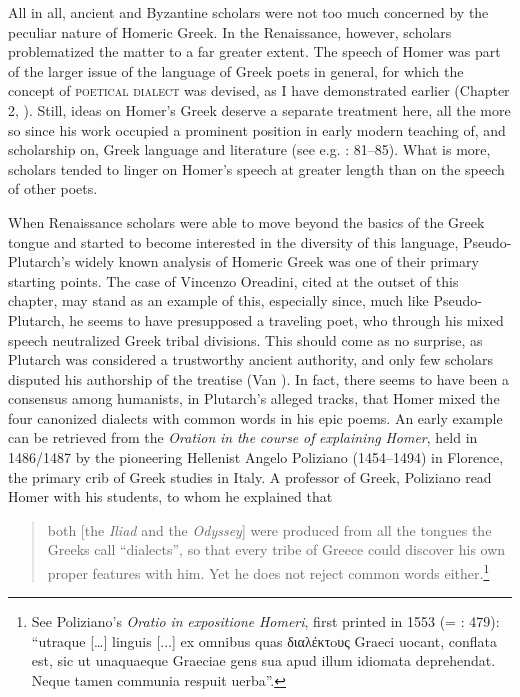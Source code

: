 All in all, ancient and Byzantine scholars were not too much concerned by the peculiar nature of Homeric Greek. In the Renaissance, however, scholars problematized the matter to a far greater extent. The speech of Homer was part of the larger issue of the language of Greek poets in general, for which the concept of \textsc{poetical} \textsc{dialect} was devised, as I have demonstrated earlier (Chapter 2, ). Still, ideas on Homer’s Greek deserve a separate treatment here, all the more so since his work occupied a prominent position in early modern teaching of, and scholarship on, Greek language and literature (see e.g. \citealt{Botley2010}: 81–85). What is more, scholars tended to linger on Homer’s speech at greater length than on the speech of other poets.

When Renaissance scholars were able to move beyond the basics of the Greek tongue and started to become interested in the diversity of this language, Pseudo-Plutarch’s widely known analysis of Homeric Greek was one of their primary starting points. The case of Vincenzo Oreadini, cited at the outset of this chapter, may stand as an example of this, especially since, much like Pseudo-Plutarch, he seems to have presupposed a traveling poet, who through his mixed speech neutralized Greek tribal divisions. This should come as no surprise, as Plutarch was considered a trustworthy ancient authority, and only few scholars disputed his authorship of the treatise (Van \citealt{Rooy2018c}). In fact, there seems to have been a consensus among humanists, in Plutarch’s alleged tracks, that Homer mixed the four canonized dialects with common words in his epic poems. An early example can be retrieved from the \textit{Oration} \textit{in} \textit{the} \textit{course} \textit{of} \textit{explaining} \textit{Homer}, held in 1486/1487 by the pioneering Hellenist Angelo Poliziano (1454–1494) in Florence, the primary crib of Greek studies in Italy. A professor of Greek, Poliziano read Homer with his students, to whom he explained that

\begin{quote}
both [the \textit{Iliad} and the \textit{Odyssey}] were produced from all the tongues the Greeks call “dialects”, so that every tribe of Greece could discover his own proper features with him. Yet he does not reject common words either.\footnote{See Poliziano’s \textit{Oratio} \textit{in} \textit{expositione} \textit{Homeri}, first printed in 1553 (= \citealt{Poliziano1553}: 479): “utraque […] linguis [...] ex omnibus quas διαλέκτoυς Graeci uocant, conflata est, sic ut unaquaeque Graeciae gens sua apud illum idiomata deprehendat. Neque tamen communia respuit uerba”.}
\end{quote}

